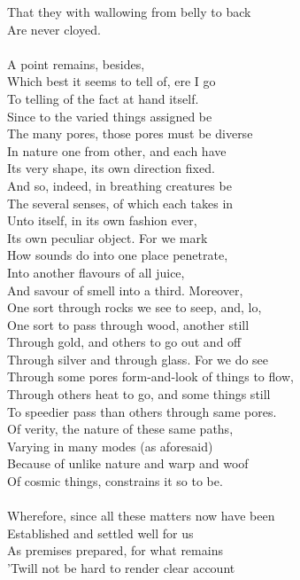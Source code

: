 That they with wallowing from belly to back\\
Are never cloyed.\\
\\
A point remains, besides,\\
Which best it seems to tell of, ere I go\\
To telling of the fact at hand itself.\\
Since to the varied things assigned be\\
The many pores, those pores must be diverse\\
In nature one from other, and each have\\
Its very shape, its own direction fixed.\\
And so, indeed, in breathing creatures be\\
The several senses, of which each takes in\\
Unto itself, in its own fashion ever,\\
Its own peculiar object. For we mark\\
How sounds do into one place penetrate,\\
Into another flavours of all juice,\\
And savour of smell into a third. Moreover,\\
One sort through rocks we see to seep, and, lo,\\
One sort to pass through wood, another still\\
Through gold, and others to go out and off\\
Through silver and through glass. For we do see\\
Through some pores form-and-look of things to flow,\\
Through others heat to go, and some things still\\
To speedier pass than others through same pores.\\
Of verity, the nature of these same paths,\\
Varying in many modes (as aforesaid)\\
Because of unlike nature and warp and woof\\
Of cosmic things, constrains it so to be.\\
\\
Wherefore, since all these matters now have been\\
Established and settled well for us\\
As premises prepared, for what remains\\
'Twill not be hard to render clear account\\
